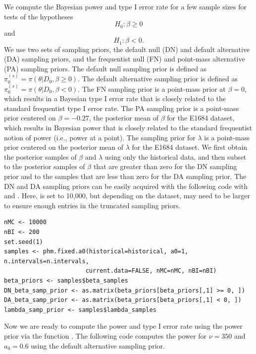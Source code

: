 We compute the Bayesian power and type I error rate for a few sample sizes for tests of the hypotheses $$H_0: \beta \ge 0$$ and $$H_1: \beta < 0.$$ We use two sets of sampling priors, the default null (DN) and default alternative (DA) sampling priors, and the frequentist null (FN) and point-mass alternative (PA) sampling priors. The default null sampling prior is defined as $\pi_0^{(s)}=\pi(\theta|D_0, \beta \ge 0)$. The default alternative sampling prior is defined as $\pi_0^{(s)}=\pi(\theta|D_0, \beta < 0)$. The FN sampling prior is a point-mass prior at $\beta=0$, which results in a Bayesian type I error rate that is closely related to the standard frequentist type I error rate. The PA sampling prior is a point-mass prior centered on $\beta=-0.27$, the posterior mean of $\beta$ for the E1684 dataset, which results in Bayesian power that is closely related to the standard frequentist notion of power (i.e., power at a point). The sampling prior for $\lambda$ is a point-mass prior centered on the posterior mean of $\lambda$ for the E1684 dataset. We first obtain the posterior samples of $\beta$ and $\lambda$ using only the historical data, and then subset to the posterior samples of $\beta$ that are greater than zero for the DN sampling prior and to the samples that are less than zero for the DA sampling prior. The DN and DA sampling priors can be easily acquired with the following code with  and . Here,  is set to 10,000, but depending on the dataset,  may need to be larger to ensure enough entries in the truncated sampling priors.

 \begin{verbatim}
nMC <- 10000
nBI <- 200
set.seed(1)
samples <- phm.fixed.a0(historical=historical, a0=1, n.intervals=n.intervals, 
                       current.data=FALSE, nMC=nMC, nBI=nBI)
beta_priors <- samples$beta_samples
DN_beta_samp_prior <- as.matrix(beta_priors[beta_priors[,1] >= 0, ])
DA_beta_samp_prior <- as.matrix(beta_priors[beta_priors[,1] < 0, ])
lambda_samp_prior <- samples$lambda_samples
\end{verbatim}
Now we are ready to compute the power and type I error rate using the power prior via the function . The following code computes the power for $\nu=350$ and $a_0=0.6$ using the default alternative sampling prior.

